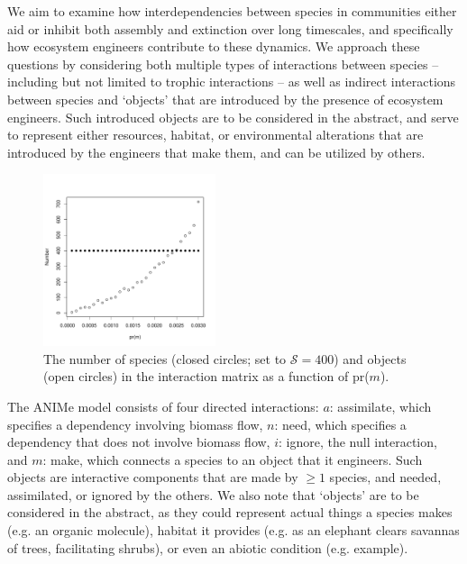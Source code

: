 \documentclass[twocolumn,preprintnumbers,amsmath,amssymb,superscriptaddress]{revtex4-1}
\begin{document}
We aim to examine how interdependencies between species in communities either aid or inhibit both assembly and extinction over long timescales, and specifically how ecosystem engineers contribute to these dynamics.
We approach these questions by considering both multiple types of interactions between species -- including but not limited to trophic interactions --  as well as indirect interactions between species and `objects' that are introduced by the presence of ecosystem engineers.
Such introduced objects are to be considered in the abstract, and serve to represent either resources, habitat, or environmental alterations that are introduced by the engineers that make them, and can be utilized by others. 




\begin{figure}
\centering
\includegraphics[width=0.45\textwidth]{fig_spob.pdf}
\caption{
The number of species (closed circles; set to $\mathcal S=400$) and objects (open circles) in the interaction matrix as a function of pr($m$).
}
\label{fig_spob}
\end{figure} 


The ANIMe model consists of four directed interactions:
$a$: assimilate, which specifies a dependency involving biomass flow,
$n$: need, which specifies a dependency that does not involve biomass flow,
$i$: ignore, the null interaction, and
$m$: make, which connects a species to an object that it engineers. Such objects are interactive components that are made by $\geq 1$ species, and needed, assimilated, or ignored by the others.
We also note that `objects' are to be considered in the abstract, as they could represent actual things a species makes (e.g. an organic molecule), habitat it provides (e.g. as an elephant clears savannas of trees, facilitating shrubs), or even an abiotic condition (e.g. example). 
\end{document}
